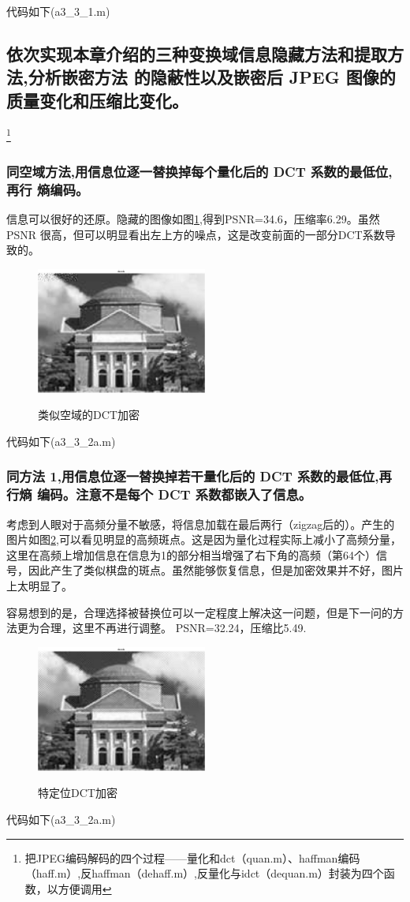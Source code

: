 \documentclass{ctexart}
\begin{document}
代码如下(a3\_3\_1.m)

\subsection{
依次实现本章介绍的三种变换域信息隐藏方法和提取方法,分析嵌密方法
的隐蔽性以及嵌密后 JPEG 图像的质量变化和压缩比变化。}
\footnote{把JPEG编码解码的四个过程——量化和dct（quan.m）、haffman编码（haff.m）,反haffman（dehaff.m）,反量化与idct（dequan.m）封装为四个函数，以方便调用}
\subsubsection{
同空域方法,用信息位逐一替换掉每个量化后的 DCT 系数的最低位,再行
熵编码。
}
信息可以很好的还原。隐藏的图像如图\ref{a332a},得到PSNR=34.6，压缩率6.29。虽然PSNR
很高，但可以明显看出左上方的噪点，这是改变前面的一部分DCT系数导致的。
\begin{figure}
    \centering
    \includegraphics[width=0.5\textwidth]{pic/a3_3_2a.jpg}\\
    \caption{类似空域的DCT加密\label{a332a}}
\end{figure}
代码如下(a3\_3\_2a.m)

\subsubsection{
同方法 1,用信息位逐一替换掉若干量化后的 DCT 系数的最低位,再行熵
编码。注意不是每个 DCT 系数都嵌入了信息。
}
考虑到人眼对于高频分量不敏感，将信息加载在最后两行（zigzag后的）。产生的图片如图\ref{a332b},可以看见明显的高频斑点。这是因为量化过程实际上减小了高频分量，这里在高频上增加信息在信息为1的部分相当增强了右下角的高频（第64个）信号，因此产生了类似棋盘的斑点。虽然能够恢复信息，但是加密效果并不好，图片上太明显了。

容易想到的是，合理选择被替换位可以一定程度上解决这一问题，但是下一问的方法更为合理，这里不再进行调整。
PSNR=32.24，压缩比5.49.
\begin{figure}
    \centering
    \includegraphics[width=0.5\textwidth]{pic/a3_3_2b.jpg}\\
    \caption{特定位DCT加密\label{a332b}}
\end{figure}
代码如下(a3\_3\_2a.m)

\end{document}
